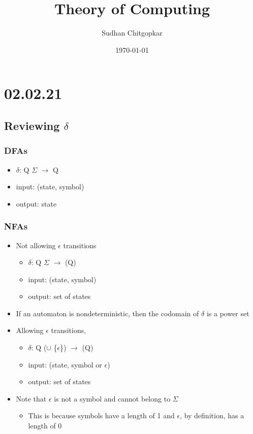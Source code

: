 \documentclass[11pt]{article}
\author{Sudhan Chitgopkar}
\date{\today}
\title{Theory of Computing}
\begin{document}
\maketitle
\section*{02.02.21}
\label{sec:org11d204c}
\subsection*{Reviewing \(\delta\)}
\label{sec:orgd5d220f}
\subsubsection*{DFAs}
\label{sec:org1d8824b}
\begin{itemize}
\item \(\delta\): Q \texttimes{} \(\Sigma\) \(\to\) Q
\item input: (state, symbol)
\item output: state
\end{itemize}
\subsubsection*{NFAs}
\label{sec:org5881c8e}
\begin{itemize}
\item Not allowing \(\epsilon\) transitions
\begin{itemize}
\item \(\delta\): Q \texttimes{} \(\Sigma\) \(\to\) \powerset(Q)
\item input: (state, symbol)
\item output: set of states
\end{itemize}
\item If an automaton is nondeterministic, then the codomain of \(\delta\) is a power set
\item Allowing \(\epsilon\) transitions,
\begin{itemize}
\item \(\delta\): Q \texttimes{} (\Simga \(\cup\) \{\(\epsilon\)\}) \(\to\) \powerset(Q)
\item input: (state, symbol or \(\epsilon\))
\item output: set of states
\end{itemize}
\item Note that \(\epsilon\) is not a symbol and cannot belong to \(\Sigma\)
\begin{itemize}
\item This is because symbols have a length of 1 and \(\epsilon\), by definition, has a length of 0
\end{itemize}
\end{itemize}
\end{document}
